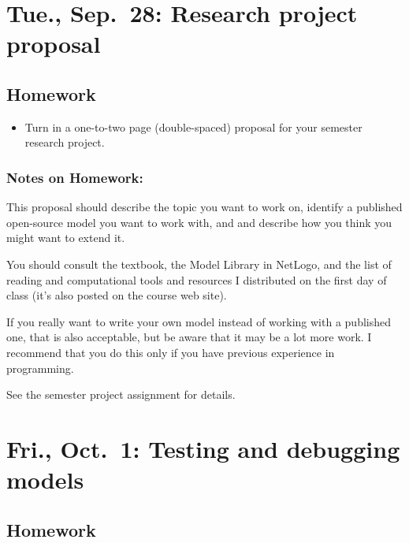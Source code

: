 \documentclass[
]{article}
\providecommand{\tightlist}{%
  \setlength{\itemsep}{0pt}\setlength{\parskip}{0pt}}
\begin{document}
\hypertarget{tue.-sep.-28-research-project-proposal}{%
\section{Tue., Sep.~28: Research project
proposal}\label{tue.-sep.-28-research-project-proposal}}

\hypertarget{homework-6}{%
\subsection{Homework}\label{homework-6}}

\begin{itemize}
\tightlist
\item
  Turn in a one-to-two page (double-spaced) proposal for your semester
  research project.
\end{itemize}

\hypertarget{notes-on-homework-4}{%
\subsubsection{Notes on Homework:}\label{notes-on-homework-4}}

This proposal should describe the topic you want to work on, identify a
published open-source model you want to work with, and and describe how
you think you might want to extend it.

You should consult the textbook, the Model Library in NetLogo, and the
list of reading and computational tools and resources I distributed on
the first day of class (it's also posted on the course web site).

If you really want to write your own model instead of working with a
published one, that is also acceptable, but be aware that it may be a
lot more work. I recommend that you do this only if you have previous
experience in programming.

See the semester project assignment for details.

\hypertarget{fri.-oct.-1-testing-and-debugging-models}{%
\section{Fri., Oct.~1: Testing and debugging
models}\label{fri.-oct.-1-testing-and-debugging-models}}

\hypertarget{homework-7}{%
\subsection{Homework}\label{homework-7}}
\end{document}
